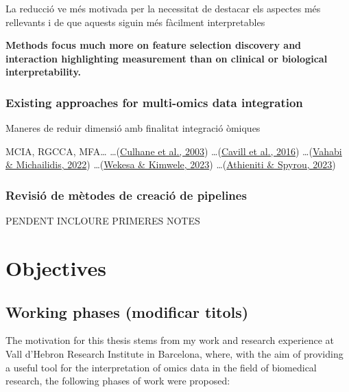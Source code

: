 \documentclass[a4paper, nobind]{templates/ociamthesis}
\renewcommand{\chaptermark}[1]{\markboth{\thechapter. #1}{\thechapter. #1}}
\begin{document}
La reducció ve més motivada per la necessitat de destacar els aspectes més rellevants i de que aquests siguin més fàcilment interpretables

\textbf{Methods focus much more on feature selection discovery and interaction highlighting measurement than on clinical or biological interpretability.}

\hypertarget{existing-approaches-for-multi-omics-data-integration}{%
\subsection{Existing approaches for multi-omics data integration}\label{existing-approaches-for-multi-omics-data-integration}}

Maneres de reduir dimensió amb finalitat integració òmiques

MCIA, RGCCA, MFA\ldots{}
\ldots{}(\protect\hyperlink{ref-culhane_cross-platform_2003}{Culhane et al., 2003})
\ldots{}(\protect\hyperlink{ref-cavill_transcriptomic_2016}{Cavill et al., 2016})
\ldots{}(\protect\hyperlink{ref-vahabi_unsupervised_2022}{Vahabi \& Michailidis, 2022})
\ldots{}(\protect\hyperlink{ref-wekesa_review_2023}{Wekesa \& Kimwele, 2023})
\ldots{}(\protect\hyperlink{ref-athieniti_guide_2023}{Athieniti \& Spyrou, 2023})

\hypertarget{revisiuxf3-de-muxe8todes-de-creaciuxf3-de-pipelines}{%
\subsection{Revisió de mètodes de creació de pipelines}\label{revisiuxf3-de-muxe8todes-de-creaciuxf3-de-pipelines}}

PENDENT INCLOURE PRIMERES NOTES

\hypertarget{objectives}{%
\chapter{Objectives}\label{objectives}}

\chaptermark{Objectives}

\minitoc 

\hypertarget{working-phases-modificar-titols}{%
\section{Working phases (modificar titols)}\label{working-phases-modificar-titols}}

The motivation for this thesis stems from my work and research experience at Vall d'Hebron Research Institute in Barcelona, where, with the aim of providing a useful tool for the interpretation of omics data in the field of biomedical research, the following phases of work were proposed:
\end{document}
